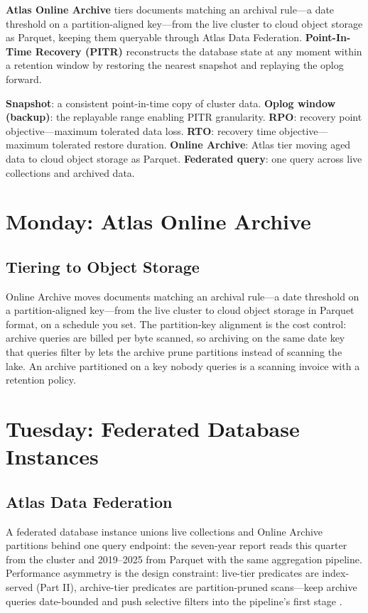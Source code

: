 \begin{definitionbox}
\textbf{Atlas Online Archive} tiers documents matching an archival rule---a date threshold on a partition-aligned key---from the live cluster to cloud object storage as Parquet, keeping them queryable through Atlas Data Federation. \textbf{Point-In-Time Recovery (PITR)} reconstructs the database state at any moment within a retention window by restoring the nearest snapshot and replaying the oplog forward.
\end{definitionbox}

\begin{keyterms}
\textbf{Snapshot}: a consistent point-in-time copy of cluster data. \textbf{Oplog window (backup)}: the replayable range enabling PITR granularity. \textbf{RPO}: recovery point objective---maximum tolerated data loss. \textbf{RTO}: recovery time objective---maximum tolerated restore duration. \textbf{Online Archive}: Atlas tier moving aged data to cloud object storage as Parquet. \textbf{Federated query}: one query across live collections and archived data.
\end{keyterms}

\section{Monday: Atlas Online Archive}
\subsection{Tiering to Object Storage}
Online Archive moves documents matching an archival rule---a date threshold on a partition-aligned key---from the live cluster to cloud object storage in Parquet format, on a schedule you set. The partition-key alignment is the cost control: archive queries are billed per byte scanned, so archiving on the same date key that queries filter by lets the archive prune partitions instead of scanning the lake. An archive partitioned on a key nobody queries is a scanning invoice with a retention policy.

\section{Tuesday: Federated Database Instances}
\subsection{Atlas Data Federation}
A federated database instance unions live collections and Online Archive partitions behind one query endpoint: the seven-year report reads this quarter from the cluster and 2019--2025 from Parquet with the same aggregation pipeline. Performance asymmetry is the design constraint: live-tier predicates are index-served (Part II), archive-tier predicates are partition-pruned scans---keep archive queries date-bounded and push selective filters into the pipeline's first stage \cite{mongodbOnlineArchiveDocs}.

